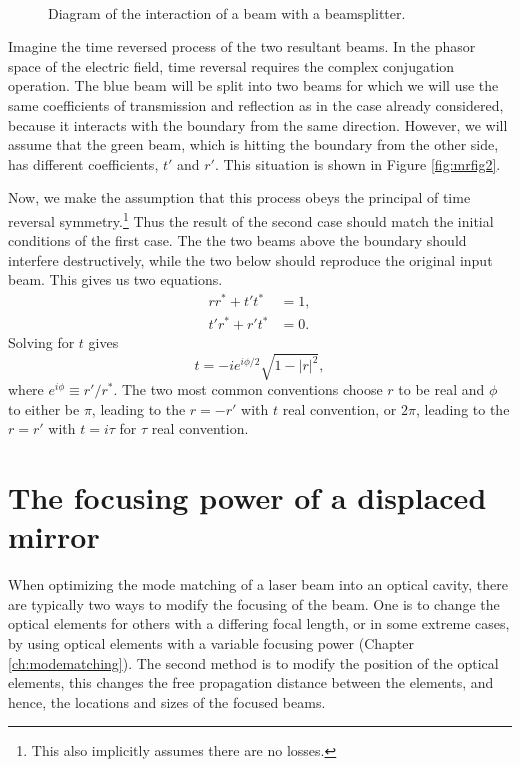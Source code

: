 \begin{figure}
  \begin{center}
  \leavevmode
  ~
  \end{center}
  \caption{Diagram of the interaction of a beam with a beamsplitter.}
  \label{fig:mrfig}
\end{figure}

Imagine the time reversed process of the two resultant beams. %
In the phasor space of the electric field, time reversal requires the complex conjugation operation. %
The blue beam will be split into two beams for which we will use the same coefficients of transmission and reflection as in the case already considered, because it interacts with the boundary from the same direction. %
However, we will assume that the green beam, which is hitting the boundary from the other side, has different coefficients, $t'$ and $r'$. %
This situation is shown in Figure \ref{fig:mrfig2}.

Now, we make the assumption that this process obeys the principal of time reversal symmetry.\footnote{This also implicitly assumes there are no losses.} Thus the result of the second case should match the initial conditions of the first case. %
The the two beams above the boundary should interfere destructively, while the two below should reproduce the original input beam. %
This gives us two equations.
\begin{align*}
rr^*+t't^*&=1,\\
t'r^*+r't^*&=0.
\end{align*}
Solving for $t$ gives
\begin{equation}
t=-ie^{i\phi/2}\sqrt{1-|r|^2},
\end{equation}
where $e^{i\phi}\equiv r'/r^*$. %
The two most common conventions choose $r$ to be real and $\phi$ to either be $\pi$, leading to the $r=-r'$ with $t$ real convention, or $2\pi$, leading to the $r=r'$ with $t=i\tau$ for $\tau$ real convention.

\section{The focusing power of a displaced mirror}
When optimizing the mode matching of a laser beam into an optical cavity, there are typically two ways to modify the focusing of the beam. %
One is to change the optical elements for others with a differing focal length, or in some extreme cases, by using optical elements with a variable focusing power (Chapter \ref{ch:modematching}). %
The second method is to modify the position of the optical elements, this changes the free propagation distance between the elements, and hence, the locations and sizes of the focused beams.

